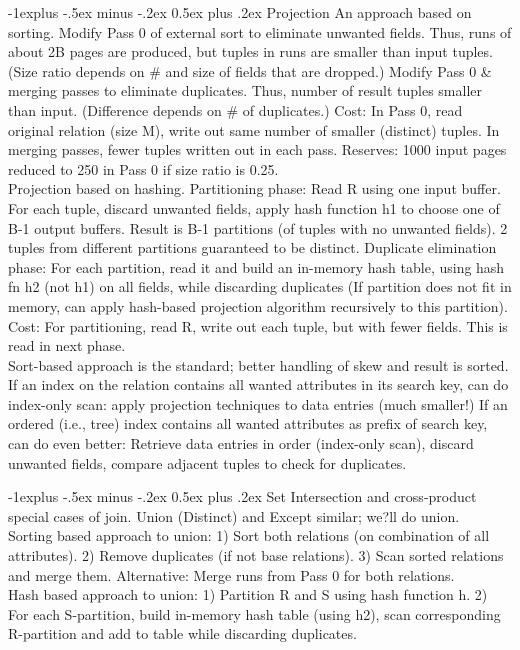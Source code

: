 \documentclass[10pt,landscape]{article}
\makeatletter
\renewcommand{\subsection}{\@startsection{subsection}{2}{0mm}%
                                {-1explus -.5ex minus -.2ex}%
                                {0.5ex plus .2ex}%
                                {\normalfont\normalsize\bfseries}}
\makeatother
\begin{document}
\begin{multicols}{3}
\subsection{Projection}
An approach based on sorting. Modify Pass 0 of external sort to eliminate unwanted fields. Thus, runs of about 2B pages are produced, but tuples in runs are smaller than input tuples. (Size ratio depends on \# and size of fields that are dropped.) Modify Pass 0 \& merging passes to eliminate duplicates. Thus, number of result tuples smaller than input. (Difference depends on \# of duplicates.) Cost: In Pass 0, read original relation (size M), write out same number of smaller (distinct) tuples. In merging passes, fewer tuples written out in each pass. Reserves: 1000 input pages reduced to 250 in Pass 0 if size ratio is 0.25. \\
Projection based on hashing. Partitioning phase: Read R using one input buffer. For each tuple, discard unwanted fields, apply hash function h1 to choose one of B-1 output buffers. Result is B-1 partitions (of tuples with no unwanted fields). 2 tuples from different partitions guaranteed to be distinct. Duplicate elimination phase: For each partition, read it and build an in-memory hash table, using hash fn h2 (not h1) on all fields, while discarding duplicates (If partition does not fit in memory, can apply hash-based projection algorithm recursively to this partition). Cost: For partitioning, read R, write out each tuple, but with fewer fields. This is read in next phase. \\
Sort-based approach is the standard; better handling of skew and result is sorted. If an index on the relation contains all wanted attributes in its search key, can do index-only scan: apply projection techniques to data entries (much smaller!) If an ordered (i.e., tree) index contains all wanted attributes as prefix of search key, can do even better: Retrieve data entries in order (index-only scan), discard unwanted fields, compare adjacent tuples to check for duplicates.

\subsection{Set}
Intersection and cross-product special cases of join. Union (Distinct) and Except similar; we?ll do union. \\
Sorting based approach to union: 1) Sort both relations (on combination of all attributes). 2) Remove duplicates (if not base relations). 3) Scan sorted relations and merge them. Alternative: Merge runs from Pass 0 for both relations. \\
Hash based approach to union: 1) Partition R and S using hash function h. 2) For each S-partition, build in-memory hash table (using h2), scan corresponding R-partition and add to table while discarding duplicates.


\end{multicols}
\end{document}
